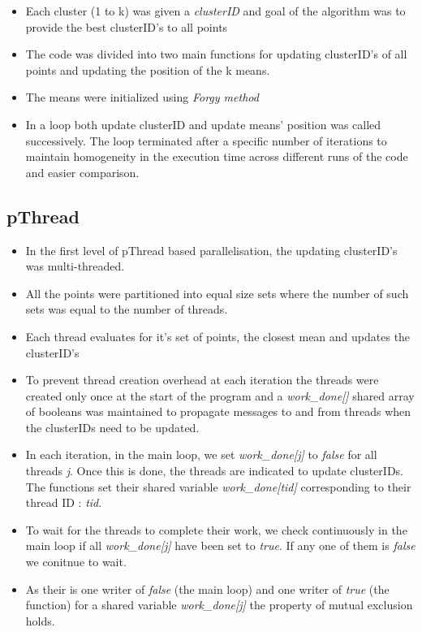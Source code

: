 \documentclass[a4paper, 11pt]{article}
\begin{document}
\begin{itemize}
    \item Each cluster (1 to k) was given a \textit{clusterID} and goal of the algorithm was to provide the best clusterID's to all points
    \item The code was divided into two main functions for updating clusterID's of all points and updating the position of the k means.
    \item The means were initialized using \textit{Forgy method}
    \item In a loop both update clusterID and update means' position was called successively. The loop terminated after a specific number of iterations to maintain homogeneity in the execution time across different runs of the code and easier comparison.
\end{itemize}

\subsection{pThread}

\begin{itemize}
    \item In the first level of pThread based parallelisation, the updating clusterID's was multi-threaded.
    \item All the points were partitioned into equal size sets where the number of such sets was equal to the number of threads.
    \item Each thread evaluates for it's set of points, the closest mean and updates the clusterID's
    \item To prevent thread creation overhead at each iteration the threads were created only once at the start of the program and a \textit{work\_done[]} shared array of booleans was maintained to propagate messages to and from threads when the clusterIDs need to be updated.
    \item In each iteration, in the main loop, we set \textit{work\_done[j]} to \textit{false} for all threads \textit{j}. Once this is done, the threads are indicated to update clusterIDs. The functions set their shared variable \textit{work\_done[tid]} corresponding to their thread ID : \textit{tid}.
    \item To wait for the threads to complete their work, we check continuously in the main loop if all \textit{work\_done[j]} have been set to \textit{true}. If any one of them is \textit{false} we conitnue to wait.
    \item As their is one writer of \textit{false} (the main loop) and one writer of \textit{true} (the function) for a shared variable \textit{work\_done[j]} the property of mutual exclusion holds.
\end{itemize}
\end{document}
